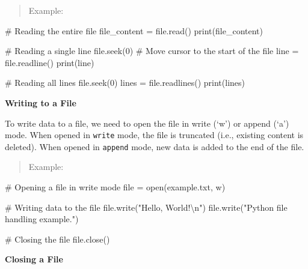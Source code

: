 \documentclass[
  letterpaper,
  DIV=11,
  numbers=noendperiod]{scrreprt}
\newenvironment{Shaded}{\begin{snugshade}}{\end{snugshade}}
\newcommand{\BuiltInTok}[1]{\textcolor[rgb]{0.00,0.23,0.31}{#1}}
\newcommand{\CharTok}[1]{\textcolor[rgb]{0.13,0.47,0.30}{#1}}
\newcommand{\CommentTok}[1]{\textcolor[rgb]{0.37,0.37,0.37}{#1}}
\newcommand{\DecValTok}[1]{\textcolor[rgb]{0.68,0.00,0.00}{#1}}
\newcommand{\NormalTok}[1]{\textcolor[rgb]{0.00,0.23,0.31}{#1}}
\newcommand{\OperatorTok}[1]{\textcolor[rgb]{0.37,0.37,0.37}{#1}}
\newcommand{\StringTok}[1]{\textcolor[rgb]{0.13,0.47,0.30}{#1}}
\theoremstyle{plain}
\theoremstyle{definition}
\theoremstyle{remark}
\begin{document}
\begin{quote}
Example:
\end{quote}

\begin{Shaded}
\begin{Highlighting}[]
\CommentTok{\# Reading the entire file}
\NormalTok{file\_content }\OperatorTok{=} \BuiltInTok{file}\NormalTok{.read()}
\BuiltInTok{print}\NormalTok{(file\_content)}

\CommentTok{\# Reading a single line}
\BuiltInTok{file}\NormalTok{.seek(}\DecValTok{0}\NormalTok{)  }\CommentTok{\# Move cursor to the start of the file}
\NormalTok{line }\OperatorTok{=} \BuiltInTok{file}\NormalTok{.readline()}
\BuiltInTok{print}\NormalTok{(line)}

\CommentTok{\# Reading all lines}
\BuiltInTok{file}\NormalTok{.seek(}\DecValTok{0}\NormalTok{)}
\NormalTok{lines }\OperatorTok{=} \BuiltInTok{file}\NormalTok{.readlines()}
\BuiltInTok{print}\NormalTok{(lines)}
\end{Highlighting}
\end{Shaded}

\textbf{Writing to a File}

To write data to a file, we need to open the file in write (`w') or
append (`a') mode. When opened in \texttt{write} mode, the file is
truncated (i.e., existing content is deleted). When opened in
\texttt{append} mode, new data is added to the end of the file.

\begin{quote}
Example:
\end{quote}

\begin{Shaded}
\begin{Highlighting}[]
\CommentTok{\# Opening a file in write mode}
\BuiltInTok{file} \OperatorTok{=} \BuiltInTok{open}\NormalTok{(}\StringTok{\textquotesingle{}example.txt\textquotesingle{}}\NormalTok{, }\StringTok{\textquotesingle{}w\textquotesingle{}}\NormalTok{)}

\CommentTok{\# Writing data to the file}
\BuiltInTok{file}\NormalTok{.write(}\StringTok{"Hello, World!}\CharTok{\textbackslash{}n}\StringTok{"}\NormalTok{)}
\BuiltInTok{file}\NormalTok{.write(}\StringTok{"Python file handling example."}\NormalTok{)}

\CommentTok{\# Closing the file}
\BuiltInTok{file}\NormalTok{.close()}
\end{Highlighting}
\end{Shaded}

\textbf{Closing a File}
\end{document}

